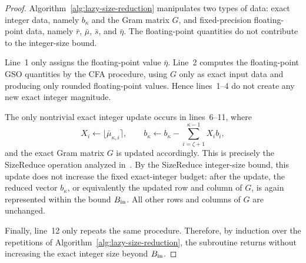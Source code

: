 \begin{proof}
Algorithm~\ref{alg:lazy-size-reduction} manipulates two types of data: exact
integer data, namely $b_\kappa$ and the Gram matrix $G$, and fixed-precision
floating-point data, namely $\bar r$, $\bar\mu$, $\bar s$, and $\bar\eta$.
The floating-point quantities do not contribute to the integer-size bound.

Line~1 only assigns the floating-point value $\bar\eta$. Line~2 computes the
floating-point GSO quantities by the CFA procedure, using $G$ only as exact
input data and producing only rounded floating-point values. Hence lines~1--4
do not create any new exact integer magnitude.

The only nontrivial exact integer update occurs in lines~6--11, where
\[
  X_i\gets \lfloor \bar\mu_{\kappa,i}\rceil,
  \qquad
  b_\kappa\gets b_\kappa-\sum_{i=\zeta+1}^{\kappa-1}X_i b_i,
\]
and the exact Gram matrix $G$ is updated accordingly. This is precisely the
SizeReduce operation analyzed in~\cite{KLKL25}. By the SizeReduce integer-size
bound, this update does not increase the fixed exact-integer budget: after the
update, the reduced vector $b_\kappa$, or equivalently the updated row and
column of $G$, is again represented within the bound $B_{\rm in}$. All other
rows and columns of $G$ are unchanged.

Finally, line~12 only repeats the same procedure. Therefore, by induction over
the repetitions of Algorithm~\ref{alg:lazy-size-reduction}, the subroutine
returns without increasing the exact integer size beyond $B_{\rm in}$.
\end{proof}



